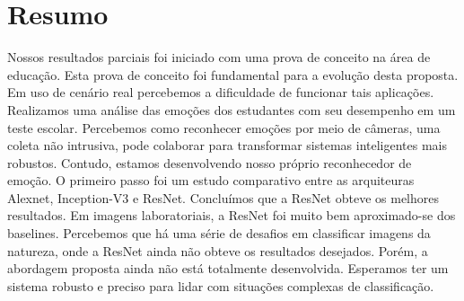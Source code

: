 \section{Resumo}\label{sec:considera}
Nossos resultados parciais foi iniciado com uma prova de conceito na área de educação. Esta prova de conceito foi fundamental para a evolução desta proposta. Em uso de cenário real percebemos a dificuldade de funcionar tais aplicações. Realizamos uma análise das emoções dos estudantes com seu desempenho em um teste escolar. Percebemos como reconhecer emoções por meio de câmeras, uma coleta não intrusiva, pode colaborar para transformar sistemas inteligentes mais robustos. Contudo, estamos desenvolvendo nosso próprio reconhecedor de emoção. O primeiro passo foi um estudo comparativo entre as arquiteuras Alexnet, Inception-V3 e ResNet. Concluímos que a ResNet obteve os melhores resultados. Em imagens laboratoriais, a ResNet foi muito bem aproximado-se dos baselines. Percebemos que há uma série de desafios em classificar imagens da natureza, onde a ResNet ainda não obteve os resultados desejados. Porém, a abordagem proposta ainda não está totalmente desenvolvida. Esperamos ter um sistema robusto e preciso para lidar com situações complexas de classificação.      

